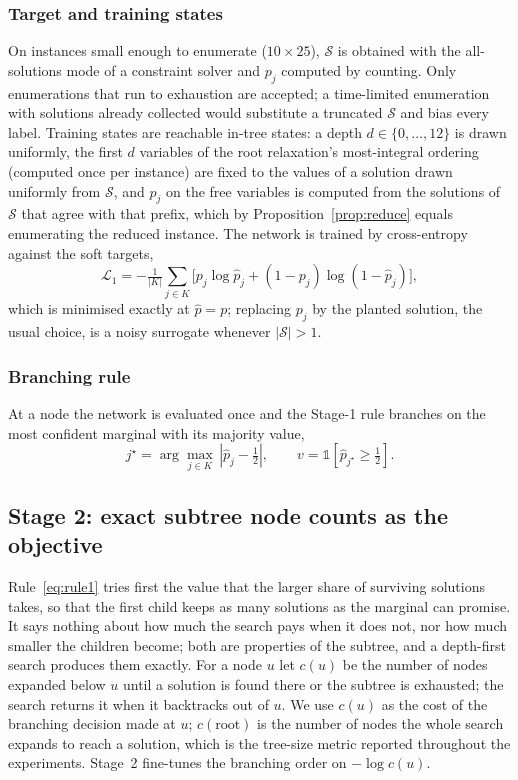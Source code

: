 \documentclass[final,5p,times,twocolumn,authoryear]{elsarticle}
\newcommand{\SOL}{\mathcal{S}}
\begin{document}
\subsubsection{Target and training states}
On instances small enough to enumerate ($10\times25$), $\SOL$ is obtained with the all-solutions mode of a constraint solver and $p_j$ computed by counting. Only enumerations that run to exhaustion are accepted; a time-limited enumeration with solutions already collected would substitute a truncated $\SOL$ and bias every label. Training states are reachable in-tree states: a depth $d\in\{0,\dots,12\}$ is drawn uniformly, the first $d$ variables of the root relaxation's most-integral ordering (computed once per instance) are fixed to the values of a solution drawn uniformly from $\SOL$, and $p_j$ on the free variables is computed from the solutions of $\SOL$ that agree with that prefix, which by Proposition~\ref{prop:reduce} equals enumerating the reduced instance. The network is trained by cross-entropy against the soft targets,
\begin{equation}
\mathcal{L}_1=-\tfrac{1}{|K|}\sum_{j\in K}\bigl[p_j\log\hat p_j+(1-p_j)\log(1-\hat p_j)\bigr],
\label{eq:loss1}
\end{equation}
which is minimised exactly at $\hat p=p$; replacing $p_j$ by the planted solution, the usual choice, is a noisy surrogate whenever $|\SOL|>1$.

\subsubsection{Branching rule}
At a node the network is evaluated once and the Stage-1 rule branches on the most confident marginal with its majority value,
\begin{equation}
j^\star=\arg\max_{j\in K}\,|\hat p_j-\tfrac12|,\qquad v=\mathbb{1}[\hat p_{j^\star}\ge\tfrac12].
\label{eq:rule1}
\end{equation}

\subsection{Stage 2: exact subtree node counts as the objective}
\label{sec:method-stage2}

Rule~\eqref{eq:rule1} tries first the value that the larger share of surviving solutions takes, so that the first child keeps as many solutions as the marginal can promise. It says nothing about how much the search pays when it does not, nor how much smaller the children become; both are properties of the subtree, and a depth-first search produces them exactly. For a node $u$ let $c(u)$ be the number of nodes expanded below $u$ until a solution is found there or the subtree is exhausted; the search returns it when it backtracks out of $u$. We use $c(u)$ as the cost of the branching decision made at $u$; $c(\text{root})$ is the number of nodes the whole search expands to reach a solution, which is the tree-size metric reported throughout the experiments. Stage~2 fine-tunes the branching order on $-\log c(u)$.
\end{document}
